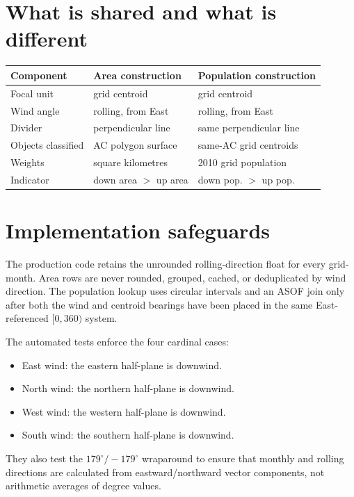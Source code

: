 \documentclass[10pt]{article}
\begin{document}
\section*{What is shared and what is different}
\begin{center}
\begin{tabular}{lll}
\hline
Component & Area construction & Population construction \\
\hline
Focal unit & grid centroid & grid centroid \\
Wind angle & rolling, from East & rolling, from East \\
Divider & perpendicular line & same perpendicular line \\
Objects classified & AC polygon surface & same-AC grid centroids \\
Weights & square kilometres & 2010 grid population \\
Indicator & down area $>$ up area & down pop. $>$ up pop. \\
\hline
\end{tabular}
\end{center}

\clearpage
\section*{Implementation safeguards}
The production code retains the unrounded rolling-direction float for every
grid-month. Area rows are never rounded, grouped, cached, or deduplicated by
wind direction. The population lookup uses circular intervals and an ASOF join
only after both the wind and centroid bearings have been placed in the same
East-referenced $[0,360)$ system.

The automated tests enforce the four cardinal cases:
\begin{itemize}
  \item East wind: the eastern half-plane is downwind.
  \item North wind: the northern half-plane is downwind.
  \item West wind: the western half-plane is downwind.
  \item South wind: the southern half-plane is downwind.
\end{itemize}
They also test the $179^\circ/-179^\circ$ wraparound to ensure that monthly and
rolling directions are calculated from eastward/northward vector components,
not arithmetic averages of degree values.
\end{document}
